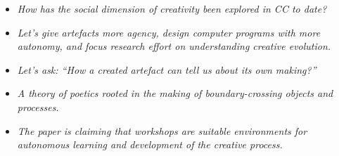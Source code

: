 \documentclass[letterpaper]{article}
\begin{document}
\begin{dialogue}

\begin{mdframed}
\begin{itemize}
\item \emph{How has the social dimension of creativity been
  explored in CC to date?}
\item \emph{Let's give artefacts more agency, design computer programs
  with more autonomy, and focus research effort on understanding
  creative evolution.}
\item \emph{Let's ask: ``How a created artefact can tell us about its own
  making?''}
\item \emph{A theory of poetics rooted in the making of
  boundary-crossing objects and processes.}
\item \emph{The paper is claiming that workshops are suitable
  environments for autonomous learning and development of the creative
  process.}
\end{itemize}
\end{mdframed}


\end{dialogue}
\end{document}
